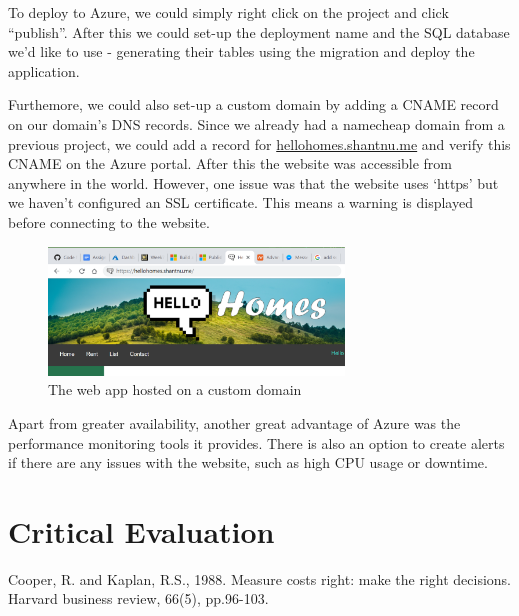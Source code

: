 \documentclass{article}
\begin{document}
        \par
            To deploy to Azure, we could simply right click on the project and click “publish”.
            After this we could set-up the deployment name and the SQL database we’d like to use - generating their tables using the migration and deploy the application.

        \par
            Furthemore, we could also set-up a custom domain by adding a CNAME record on our domain’s DNS records.
            Since we already had a namecheap domain from a previous project, we could add a record for \href{https://hellohomes.shantnu.me/}{hellohomes.shantnu.me} and verify this CNAME on the Azure portal.
            After this the website was accessible from anywhere in the world.
            However, one issue was that the website uses ‘https’ but we haven’t configured an SSL certificate.
            This means a warning is displayed before connecting to the website.

            \begin{figure}[ht]
                \centering
                \includegraphics[width=0.7\textwidth]{figures/custom_domain.png}
                \caption[Custom Domain]{The web app hosted on a custom domain}
                \label{fig:custom_domain}
            \end{figure}

        \par
            Apart from greater availability, another great advantage of Azure was the performance monitoring tools it provides.
            There is also an option to create alerts if there are any issues with the website, such as high CPU usage or downtime.


\section{Critical Evaluation}

\begin{thebibliography}{1}
        Cooper, R. and Kaplan, R.S., 1988. Measure costs right: make the right decisions. Harvard business review, 66(5), pp.96-103.
\end{thebibliography}
\end{document}
